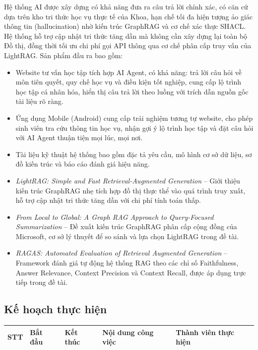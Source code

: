 \begin{refsection}
Hệ thống AI được xây dựng có khả năng đưa ra câu trả lời chính xác, có căn cứ dựa trên kho tri thức học vụ thực tế của Khoa, hạn chế tối đa hiện tượng ảo giác thông tin (hallucination) nhờ kiến trúc GraphRAG và cơ chế xác thực SHACL. Hệ thống hỗ trợ cập nhật tri thức tăng dần mà không cần xây dựng lại toàn bộ Đồ thị, đồng thời tối ưu chi phí gọi API thông qua cơ chế phân cấp truy vấn của LightRAG. Sản phẩm đầu ra bao gồm:

\begin{itemize}[label={--}, leftmargin=1.5em]
    \item Website tư vấn học tập tích hợp AI Agent, có khả năng: trả lời câu hỏi về môn tiên quyết, quy chế học vụ và điều kiện tốt nghiệp, cung cấp lộ trình học tập cá nhân hóa, hiển thị câu trả lời theo luồng với trích dẫn nguồn gốc tài liệu rõ ràng.
    \item Ứng dụng Mobile (Android) cung cấp trải nghiệm tương tự website, cho phép sinh viên tra cứu thông tin học vụ, nhận gợi ý lộ trình học tập và đặt câu hỏi với AI Agent thuận tiện mọi lúc, mọi nơi.
    \item Tài liệu kỹ thuật hệ thống bao gồm đặc tả yêu cầu, mô hình cơ sở dữ liệu, sơ đồ kiến trúc và báo cáo đánh giá hiệu năng.
\end{itemize}

\begin{itemize}[label={--}, leftmargin=1.5em]
    \item \textit{LightRAG: Simple and Fast Retrieval-Augmented Generation} \cite{lightrag2024} -- Giới thiệu kiến trúc GraphRAG nhẹ tích hợp đồ thị thực thể vào quá trình truy xuất, hỗ trợ cập nhật tri thức tăng dần với chi phí tính toán thấp.
    \item \textit{From Local to Global: A Graph RAG Approach to Query-Focused Summarization} \cite{graphrag2024} -- Đề xuất kiến trúc GraphRAG phân cấp cộng đồng của Microsoft, cơ sở lý thuyết để so sánh và lựa chọn LightRAG trong đề tài.
    \item \textit{RAGAS: Automated Evaluation of Retrieval Augmented Generation} \cite{ragas2023} -- Framework đánh giá tự động hệ thống RAG theo các chỉ số Faithfulness, Answer Relevance, Context Precision và Context Recall, được áp dụng trực tiếp trong đề tài.
\end{itemize}

\subsection*{\thepropsubsec\quad Kế hoạch thực hiện}
{\small
\begin{longtable}{|C{0.9cm}|C{2.2cm}|C{2.2cm}|L{5.8cm}|L{2.4cm}|}
    \hline
    STT & Bắt đầu & Kết thúc & Nội dung công việc & Thành viên thực hiện \\
    \hline
    \endfirsthead


\end{longtable}}
\end{refsection}
